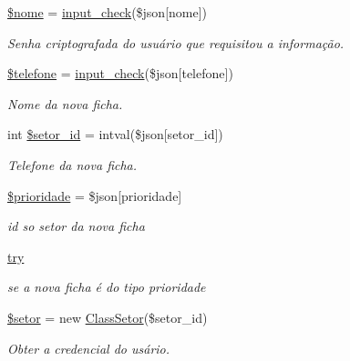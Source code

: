 \begin{DoxyCompactItemize}
\hyperlink{main_page_2painel_geral_2new_8php_ac8c9d9dd5d90fa5854f0cb8397084ebd}{\$nome} = \hyperlink{_header_8php_a8909d20d656fecf83ebaa2bed0cab2c1}{input\+\_\+check}(\$json\mbox{[}\textquotesingle{}nome\textquotesingle{}\mbox{]})
\begin{DoxyCompactList}\small\item\em Senha criptografada do usuário que requisitou a informação. \end{DoxyCompactList}\item 
\hyperlink{main_page_2painel_geral_2new_8php_af0677db4542a022e657eba3a67ee9c3c}{\$telefone} = \hyperlink{_header_8php_a8909d20d656fecf83ebaa2bed0cab2c1}{input\+\_\+check}(\$json\mbox{[}\textquotesingle{}telefone\textquotesingle{}\mbox{]})
\begin{DoxyCompactList}\small\item\em Nome da nova ficha. \end{DoxyCompactList}\item 
int \hyperlink{main_page_2painel_geral_2new_8php_a93c5ed26f2451c1cc65c3dfe545a913b}{\$setor\+\_\+id} = intval(\$json\mbox{[}\textquotesingle{}setor\+\_\+id\textquotesingle{}\mbox{]})
\begin{DoxyCompactList}\small\item\em Telefone da nova ficha. \end{DoxyCompactList}\item 
\hyperlink{main_page_2painel_geral_2new_8php_a03082e938e33de61852b47220d243e91}{\$prioridade} = \$json\mbox{[}\textquotesingle{}prioridade\textquotesingle{}\mbox{]}
\begin{DoxyCompactList}\small\item\em id so setor da nova ficha \end{DoxyCompactList}\item 
\hyperlink{main_page_2painel_geral_2new_8php_abe4cc9788f52e49485473dc699537388}{try}
\begin{DoxyCompactList}\small\item\em se a nova ficha é do tipo prioridade \end{DoxyCompactList}\item 
\hyperlink{main_page_2painel_geral_2new_8php_a87435a25b7cae617cf284c729b6e835c}{\$setor} = new \hyperlink{class_class_setor}{Class\+Setor}(\$setor\+\_\+id)
\begin{DoxyCompactList}\small\item\em Obter a credencial do usário. \end{DoxyCompactList}\item 

\end{DoxyCompactItemize}
